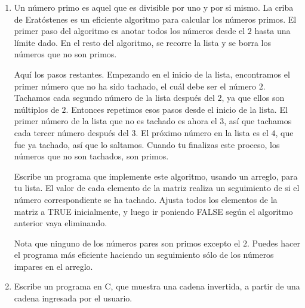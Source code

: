 \documentclass[11pt,a4paper]{article}
\newcounter{num}
\begin{document}
\begin{enumerate}
\item Un n\'umero primo es aquel que es divisible por uno y por si mismo. La criba de Erat\'ostenes es un eficiente algoritmo para calcular los n\'umeros primos. El primer paso del algoritmo es anotar todos los n\'umeros desde el $2$ hasta una l\'imite dado. En el resto del algoritmo, se recorre  la lista y se borra los n\'umeros que no son primos.

Aqu\'i los pasos restantes. Empezando en el inicio de la lista, encontramos el primer n\'umero que no ha sido tachado, el cu\'al debe ser el n\'umero $2$. Tachamos cada  segundo n\'umero de la lista despu\'es del $2$, ya que ellos son m\'ultiplos de $2$. Entonces repetimos esos pasos desde el inicio de la lista. El primer n\'umero de la lista que no es tachado es ahora el $3$, as\'i que tachamos cada tercer n\'umero despu\'es del $3$. El pr\'oximo n\'umero en la lista es el $4$, que fue ya tachado, as\'i que lo saltamos. Cuando tu finalizas este proceso, los n\'umeros que no son tachados, son primos.

Escribe un programa que implemente este algoritmo, usando un arreglo, para tu lista. El valor de cada elemento de la matriz realiza un seguimiento de si el n\'umero correspondiente se ha tachado. Ajusta todos los elementos de la matriz a TRUE inicialmente, y luego ir poniendo FALSE	 seg\'un el algoritmo anterior vaya eliminando.

Nota que ninguno de los n\'umeros pares son primos excepto el $2$. Puedes hacer el programa m\'as eficiente	 haciendo un seguimiento s\'olo de los n\'umeros impares en el arreglo. 

\item Escribe un programa en C, que muestra una cadena invertida, a partir de una cadena \mbox{ingresada} por el usuario.
\end{enumerate}
\end{document}
